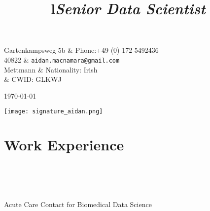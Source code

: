 \documentclass[overlapped, line, 11pt, letterpaper]{res}
\begin{document}

\setlength{\leftmargini}{1em}
\renewcommand{\labelitemi}{$\bullet$}


\renewcommand{\namefont}{\large\textbf}


\begin{resume}

\begin{ncolumn}{2}
  Gartenkampsweg 5b	& Phone:+49 (0) 172 5492436\\
  40822	& {\small \tt aidan.macnamara@gmail.com} \\
  Mettmann	& Nationality: Irish \\
  	& CWID: GLKWJ
\end{ncolumn}

\today 

\texttt{[image: signature\_aidan.png]}




\section{\bf Work Experience}
\begin{formatb}
\title{l} \\
\\
\body \\
\end{formatb}

\title{\it Senior Data Scientist} 
\begin{position}
Acute Care Contact for Biomedical Data Science
\end{position}


\end{resume}
\end{document}
